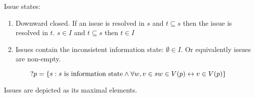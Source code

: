 Issue states:
\begin{enumerate}
    \item Downward closed. If an issue is resolved in \(s\) and \(t\subseteq s\)
          then the issue is resolved in \(t\). \(s\in I\) and \(t\subseteq s\)
          then \(t\in I\)

    \item Issues contain the inconsistent information state: \(\emptyset\in I\).
          Or equivalently issues are non-empty.
\end{enumerate}

\[
    ?p=\left\{s:\text{\(s\) is information state} \wedge \forall w,v\in s w\in V(p)\leftrightarrow v\in V(p)\right\}
\]

Issues are depicted as its maximal elements.
